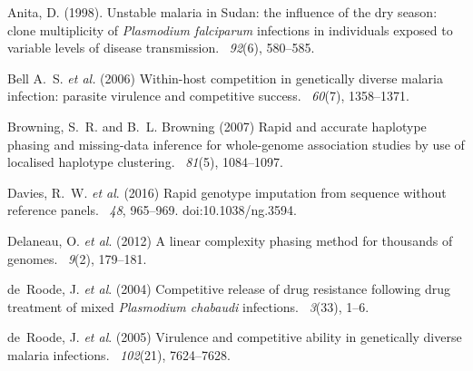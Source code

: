 \documentclass{bioinfo}
\begin{document}
\begin{thebibliography}{}

Anita, D. (1998).
\newblock Unstable malaria in Sudan: the influence of the dry season: clone
  multiplicity of {\it Plasmodium falciparum} infections in individuals exposed to
  variable levels of disease transmission.
~{\em 92\/}(6), 580--585.

Bell A.~S. {\em et al.} (2006)
\newblock Within-host competition in genetically diverse malaria infection: parasite virulence and competitive success.
~{\em 60}(7), 1358--1371.

Browning, S.~R. and B.~L. Browning (2007)
\newblock Rapid and accurate haplotype phasing and missing-data inference for
  whole-genome association studies by use of localised haplotype clustering.
~{\em 81\/}(5), 1084--1097.

Davies, R.~W. {\em et al}. (2016)
Rapid genotype imputation from sequence without reference panels.
~{\em 48\/}, 965--969. doi:10.1038/ng.3594.

Delaneau, O. {\em et al}. (2012)
\newblock A linear complexity phasing method for thousands of genomes.
~{\em 9\/}(2), 179--181.

de~Roode, J. {\em et al}. (2004)
\newblock Competitive release of drug resistance following drug treatment of mixed {\it Plasmodium chabaudi} infections.
~{\em 3\/}(33), 1--6.

de~Roode, J. {\em et al}. (2005)
\newblock Virulence and competitive ability in genetically diverse malaria infections.
~{\em 102\/}(21), 7624--7628.


\end{thebibliography}
\end{document}
